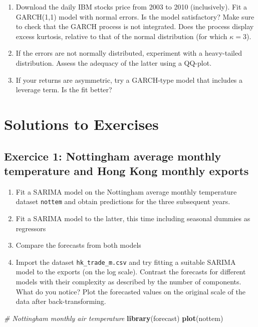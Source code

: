 \documentclass[]{book}
\newenvironment{Shaded}{\begin{snugshade}}{\end{snugshade}}
\newcommand{\KeywordTok}[1]{\textcolor[rgb]{0.13,0.29,0.53}{\textbf{#1}}}
\newcommand{\CommentTok}[1]{\textcolor[rgb]{0.56,0.35,0.01}{\textit{#1}}}
\newcommand{\NormalTok}[1]{#1}
\providecommand{\tightlist}{%
  \setlength{\itemsep}{0pt}\setlength{\parskip}{0pt}}
\begin{document}
\begin{enumerate}
\def\labelenumi{\arabic{enumi}.}
\tightlist
\item
  Download the daily IBM stocks price from 2003 to 2010 (inclusively).
  Fit a GARCH(1,1) model with normal errors. Is the model satisfactory?
  Make sure to check that the GARCH process is not integrated. Does the
  process display excess kurtosis, relative to that of the normal
  distribution (for which \(\kappa=3\)).
\item
  If the errors are not normally distributed, experiment with a
  heavy-tailed distribution. Assess the adequacy of the latter using a
  QQ-plot.
\item
  If your returns are asymmetric, try a GARCH-type model that includes a
  leverage term. Is the fit better?
\end{enumerate}

\section{Solutions to Exercises}\label{solutions-to-exercises-2}

\subsection{Exercice 1: Nottingham average monthly temperature and Hong
Kong monthly
exports}\label{exercice-1-nottingham-average-monthly-temperature-and-hong-kong-monthly-exports-1}

\begin{enumerate}
\def\labelenumi{\arabic{enumi}.}
\tightlist
\item
  Fit a SARIMA model on the Nottingham average monthly temperature
  dataset \texttt{nottem} and obtain predictions for the three
  subsequent years.
\item
  Fit a SARIMA model to the latter, this time including seasonal dummies
  as regressors
\item
  Compare the forecasts from both models
\item
  Import the dataset \texttt{hk\_trade\_m.csv} and try fitting a
  suitable SARIMA model to the exports (on the log scale). Contrast the
  forecasts for different models with their complexity as described by
  the number of components. What do you notice? Plot the forecasted
  values on the original scale of the data after back-transforming.
\end{enumerate}

\begin{Shaded}
\begin{Highlighting}[]
\CommentTok{# Nottingham monthly air temperature}
\KeywordTok{library}\NormalTok{(forecast)}
\KeywordTok{plot}\NormalTok{(nottem)}
\end{Highlighting}
\end{Shaded}
\end{document}
